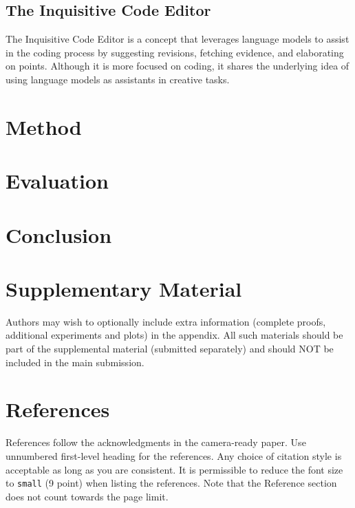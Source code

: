 \documentclass{article}
\begin{document}
\subsection{The Inquisitive Code Editor}

The Inquisitive Code Editor is a concept that leverages language models to assist in
the coding process by suggesting revisions, fetching evidence, and elaborating on
points. Although it is more focused on coding, it shares the underlying idea of using
language models as assistants in creative tasks.

\section{Method}
\label{method}




\section{Evaluation}
\label{eval}


\section{Conclusion}
\label{conclusion}





\section{Supplementary Material}

Authors may wish to optionally include extra information (complete proofs, additional experiments and plots) in the appendix. All such materials should be part of the supplemental material (submitted separately) and should NOT be included in the main submission.


\section*{References}


References follow the acknowledgments in the camera-ready paper. Use unnumbered first-level heading for
the references. Any choice of citation style is acceptable as long as you are
consistent. It is permissible to reduce the font size to \verb+small+ (9 point)
when listing the references.
Note that the Reference section does not count towards the page limit.
\medskip
\end{document}

